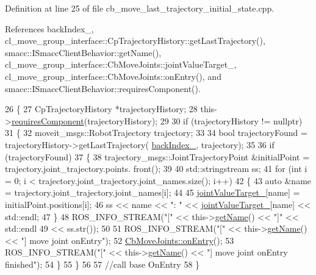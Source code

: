 Definition at line 25 of file cb\+\_\+move\+\_\+last\+\_\+trajectory\+\_\+initial\+\_\+state.\+cpp.



References back\+Index\+\_\+, cl\+\_\+move\+\_\+group\+\_\+interface\+::\+Cp\+Trajectory\+History\+::get\+Last\+Trajectory(), smacc\+::\+I\+Smacc\+Client\+Behavior\+::get\+Name(), cl\+\_\+move\+\_\+group\+\_\+interface\+::\+Cb\+Move\+Joints\+::joint\+Value\+Target\+\_\+, cl\+\_\+move\+\_\+group\+\_\+interface\+::\+Cb\+Move\+Joints\+::on\+Entry(), and smacc\+::\+I\+Smacc\+Client\+Behavior\+::requires\+Component().


\begin{DoxyCode}
26     \{
27         CpTrajectoryHistory *trajectoryHistory;
28         this->\hyperlink{classsmacc_1_1ISmaccClientBehavior_a19c6d658c8e809bb93bfdc9b639a3ac3}{requiresComponent}(trajectoryHistory);
29 
30         \textcolor{keywordflow}{if} (trajectoryHistory != \textcolor{keyword}{nullptr})
31         \{
32             moveit\_msgs::RobotTrajectory trajectory;
33 
34             \textcolor{keywordtype}{bool} trajectoryFound = trajectoryHistory->getLastTrajectory(
      \hyperlink{classcl__move__group__interface_1_1CbMoveLastTrajectoryInitialState_ac4056048a84431f4256beecd03b956b2}{backIndex\_}, trajectory);
35 
36             \textcolor{keywordflow}{if} (trajectoryFound)
37             \{
38                 trajectory\_msgs::JointTrajectoryPoint &initialPoint = trajectory.joint\_trajectory.points.
      front();
39 
40                 std::stringstream ss;
41                 \textcolor{keywordflow}{for} (\textcolor{keywordtype}{int} i = 0; i < trajectory.joint\_trajectory.joint\_names.size(); i++)
42                 \{
43                     \textcolor{keyword}{auto} &name = trajectory.joint\_trajectory.joint\_names[i];
44 
45                     \hyperlink{classcl__move__group__interface_1_1CbMoveJoints_a8103f7c923a34d9bf5a2c374ff88a277}{jointValueTarget\_}[name] = initialPoint.positions[i];
46                     ss << name << \textcolor{stringliteral}{": "} << \hyperlink{classcl__move__group__interface_1_1CbMoveJoints_a8103f7c923a34d9bf5a2c374ff88a277}{jointValueTarget\_}[name] << std::endl;
47                 \}
48                 ROS\_INFO\_STREAM(\textcolor{stringliteral}{"["} << this->\hyperlink{classsmacc_1_1ISmaccClientBehavior_a18e4bec9460b010f2894c0f7e7064a34}{getName}() << \textcolor{stringliteral}{"]"} << std::endl
49                                     << ss.str());
50 
51                 ROS\_INFO\_STREAM(\textcolor{stringliteral}{"["} << this->\hyperlink{classsmacc_1_1ISmaccClientBehavior_a18e4bec9460b010f2894c0f7e7064a34}{getName}() << \textcolor{stringliteral}{"] move joint onEntry"});
52                 \hyperlink{classcl__move__group__interface_1_1CbMoveJoints_a23e4181af695aed9fa6bb4ae3f17fd76}{CbMoveJoints::onEntry}();
53                 ROS\_INFO\_STREAM(\textcolor{stringliteral}{"["} << this->\hyperlink{classsmacc_1_1ISmaccClientBehavior_a18e4bec9460b010f2894c0f7e7064a34}{getName}() << \textcolor{stringliteral}{"] move joint onEntry finished"});
54             \}
55         \}
56 
57         \textcolor{comment}{//call base OnEntry}
58     \}
\end{DoxyCode}
